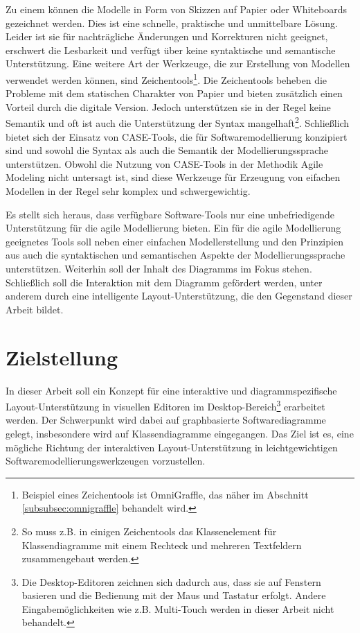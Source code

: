 Zu einem können die Modelle in Form von Skizzen auf Papier oder Whiteboards gezeichnet werden. Dies ist eine schnelle, praktische und unmittelbare Lösung. Leider ist sie für nachträgliche Änderungen und Korrekturen nicht geeignet, erschwert die Lesbarkeit und verfügt über keine syntaktische und semantische Unterstützung. Eine weitere Art der Werkzeuge, die zur Erstellung von Modellen verwendet werden können, sind Zeichentools\footnote{Beispiel eines Zeichentools ist OmniGraffle, das näher im Abschnitt \ref{subsubsec:omnigraffle} behandelt wird.}. Die Zeichentools beheben die Probleme mit dem statischen Charakter von Papier und bieten zusätzlich einen Vorteil durch die digitale Version. Jedoch unterstützen sie in der Regel keine Semantik und oft ist auch die Unterstützung der Syntax mangelhaft\footnote{So muss z.B. in einigen Zeichentools das Klassenelement für Klassendiagramme mit einem Rechteck und mehreren Textfeldern zusammengebaut werden.}. Schließlich bietet sich der Einsatz von CASE-Tools, die für Softwaremodellierung konzipiert sind und sowohl die Syntax als auch die Semantik der Modellierungssprache unterstützen. Obwohl die Nutzung von CASE-Tools in der Methodik Agile Modeling nicht untersagt ist, sind diese Werkzeuge für Erzeugung von eifachen Modellen in der Regel sehr komplex und schwergewichtig.

Es stellt sich heraus, dass verfügbare Software-Tools nur eine unbefriedigende Unterstützung für die agile Modellierung bieten. Ein für die agile Modellierung geeignetes Tools soll neben einer einfachen Modellerstellung und den Prinzipien aus \cite{Ambler02Agile} auch die syntaktischen und semantischen Aspekte der Modellierungssprache unterstützen. Weiterhin soll der Inhalt des Diagramms im Fokus stehen. Schließlich soll die Interaktion mit dem Diagramm gefördert werden, unter anderem durch eine intelligente Layout-Unterstützung, die den Gegenstand dieser Arbeit bildet.

\section{Zielstellung}

In dieser Arbeit soll ein Konzept für eine interaktive und diagrammspezifische Layout-Un\-ter\-stüt\-zung in visuellen Editoren im Desktop-Bereich\footnote{Die Desktop-Editoren zeichnen sich dadurch aus, dass sie auf Fenstern basieren und die Bedienung mit der Maus und Tastatur erfolgt. Andere Eingabemöglichkeiten wie z.B. Multi-Touch werden in dieser Arbeit nicht behandelt.} erarbeitet werden. Der Schwerpunkt wird dabei auf graphbasierte Softwarediagramme gelegt, insbesondere wird auf Klassendiagramme eingegangen. Das Ziel ist es, eine mögliche Richtung der interaktiven Layout-Unterstützung in leichtgewichtigen Softwaremodellierungswerkzeugen vorzustellen.

